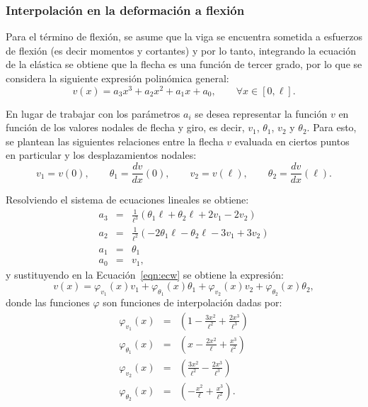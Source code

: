 \subsubsection{Interpolación en la deformación a flexión}

Para el término de flexión, se asume que la viga se encuentra sometida a esfuerzos de flexión (es decir momentos y cortantes) y por lo tanto, integrando la ecuación de la elástica se obtiene que la flecha es una función de tercer grado, por lo que se considera la siguiente expresión polinómica general:
%
\begin{equation}\label{eqn:ecw}
	v(x) = a_3 x^3 + a_2 x^2 + a_1 x + a_0, \qquad \forall x \in [0,\ell].
\end{equation}

En lugar de trabajar con los parámetros $a_i$ se desea representar la función $v$ en función de los valores nodales de flecha y giro, es decir, $v_1$,  $\theta_1$, $v_2$ y $\theta_2$. %
%
Para esto, se plantean las siguientes relaciones entre la flecha $v$ evaluada en ciertos puntos en particular y los desplazamientos nodales:
%
\begin{equation}
	v_1 = v(0), \qquad
	\theta_1 = \frac{d v}{d x} (0), \qquad
	v_2 = v(\ell), \qquad
	\theta_2 = \frac{d v}{d x}(\ell).
\end{equation}

Resolviendo el sistema de ecuaciones lineales se obtiene:
%
\begin{eqnarray}
	a_3 &=& \frac{1}{\ell^3} \left( \theta_{1} \ell + \theta_{2} \ell + 2 v_{1} - 2 v_{2} \right) \nonumber\\
	a_2 &=&	\frac{1}{\ell^2} \left( - 2 \theta_{1} \ell - \theta_{2}  \ell - 	3 v_{1} + 3 v_{2}  \right) \nonumber\\
	a_1 &=&	\theta_{1} \nonumber\\
	a_0 &=&	v_{1}, \nonumber
\end{eqnarray}
%
y sustituyendo en la Ecuación~\eqref{eqn:ecw} se obtiene la expresión:
%
\begin{equation} \label{eqn:elastica}
	v(x) =  \varphi_{v_1}(x) v_1 + \varphi_{\theta_1}(x) \theta_1
	+ \varphi_{v_2}(x) v_2 + \varphi_{\theta_2}(x) \theta_2,
\end{equation}
%
donde las funciones $\varphi$ son funciones de interpolación dadas por:
%
\begin{eqnarray}
	\varphi_{v_1} (x) &=& \left(1 - \frac{3 x^{2}}{\ell^{2}} + \frac{2 x^{3}}{\ell^{3}}\right) \\
	\varphi_{\theta_1} (x) &=&	\left(x - \frac{2 x^{2}}{\ell} + \frac{x^{3}}{\ell^{2}}\right) \\
	\varphi_{v_2} (x) &=&	\left(\frac{3 x^{2}}{\ell^{2}} - \frac{2 x^{3}}{\ell^{3}}\right) \\
	\varphi_{\theta_2} (x) &=& \left(- \frac{x^{2}}{\ell} + \frac{x^{3}}{\ell^{2}}\right) .
\end{eqnarray}

